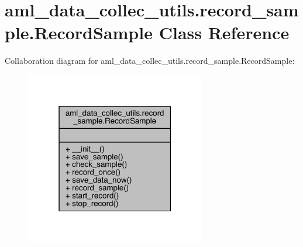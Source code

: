 \hypertarget{classaml__data__collec__utils_1_1record__sample_1_1_record_sample}{}\section{aml\+\_\+data\+\_\+collec\+\_\+utils.\+record\+\_\+sample.\+Record\+Sample Class Reference}
\label{classaml__data__collec__utils_1_1record__sample_1_1_record_sample}


Collaboration diagram for aml\+\_\+data\+\_\+collec\+\_\+utils.\+record\+\_\+sample.\+Record\+Sample\+:\nopagebreak
\begin{figure}[H]
\begin{center}
\leavevmode
\includegraphics[width=223pt]{classaml__data__collec__utils_1_1record__sample_1_1_record_sample__coll__graph}
\end{center}
\end{figure}
